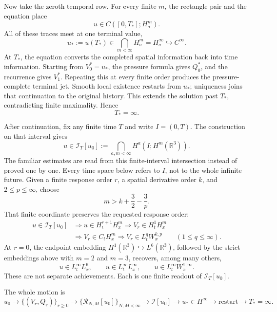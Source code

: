 Now take the zeroth temporal row.  For every finite \(m\), the rectangle pair
and the equation place
\[
u\in C([0,T_*];H^m_\sigma).
\]
All of these traces meet at one terminal value,
\[
u_*:=u(T_*)
\in\bigcap_{m<\infty}H^m_\sigma
=H^\infty_\sigma
\hookrightarrow C^\infty.
\]
At \(T_*\), the equation converts the completed spatial information back into
time information.  Starting from \(V_0^*=u_*\), the pressure formula gives
\(Q_0^*\), and the recurrence gives \(V_1^*\).  Repeating this at every finite
order produces the pressure-complete terminal jet.  Smooth local existence
restarts from \(u_*\); uniqueness joins that continuation to the original
history.  This extends the solution past \(T_*\), contradicting finite
maximality.  Hence
\[
T_*=\infty.
\]

After continuation, fix any finite time \(T\) and write \(I=(0,T)\).  The
construction on that interval gives
\[
u\in\mathcal I_T[u_0]
:=\bigcap_{a,m<\infty}H^a(I;H^m(\mathbb R^3)).
\]
The familiar estimates are read from this finite-interval intersection instead
of proved one by one.  Every time space below refers to \(I\), not to the whole
infinite future.  Given a finite response order \(r\), a spatial
derivative order \(k\), and \(2\le p\le\infty\), choose
\[
m>k+\frac32-\frac3p.
\]
That finite coordinate preserves the requested response order:
\[
\begin{aligned}
u\in\mathcal I_T[u_0]
&\Longrightarrow u\in H_t^{r+1}H_x^m
\Longrightarrow V_r\in H_t^1H_x^m\\
&\Longrightarrow V_r\in C_tH_x^m
\Longrightarrow V_r\in L_t^qW_x^{k,p}
\qquad(1\le q\le\infty).
\end{aligned}
\]
At \(r=0\), the endpoint embedding
\(H^1(\mathbb R^3)\hookrightarrow L^6(\mathbb R^3)\), followed by the strict
embeddings above with \(m=2\) and \(m=3\), recovers, among many others,
\[
u\in L_t^\infty L_x^6,
\qquad
u\in L_t^\infty L_x^\infty,
\qquad
u\in L_t^\infty W_x^{1,\infty}.
\]
These are not separate achievements.  Each is one finite readout of
\(\mathcal I_T[u_0]\).

The whole motion is
\[
\boxed{
u_0
\longrightarrow \{(V_r,Q_r)\}_{r\ge0}
\longrightarrow \{\mathcal R_{N,M}[u_0]\}_{N,M<\infty}
\longrightarrow \mathcal I[u_0]
\longrightarrow u_*\in H^\infty
\longrightarrow \text{restart}
\longrightarrow T_*=\infty.
}
\]

\endgroup
